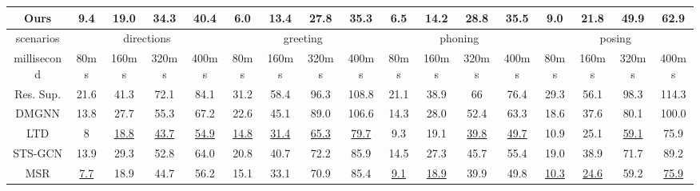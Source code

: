 \begin{table}[h]
{\begin{tabular}{c|cccc|cccc|cccc|cccc}
    Ours   & \textbf{9.4}  & \textbf{19.0} & \textbf{34.3} & \textbf{40.4} & \textbf{6.0}  & \textbf{13.4} & \textbf{27.8} & \textbf{35.3} & \textbf{6.5}  & \textbf{14.2} & \textbf{28.8} & \textbf{35.5} & \textbf{9.0} & \textbf{21.8} & \textbf{49.9} & \textbf{62.9} \\\hline
    scenarios   & \multicolumn{4}{c|}{directions}                                & \multicolumn{4}{c|}{greeting}                                  & \multicolumn{4}{c|}{phoning}                                   & \multicolumn{4}{c}{posing}                                   \\ \hline
    millisecond & 80ms          & 160ms         & 320ms         & 400ms         & 80ms          & 160ms         & 320ms         & 400ms         & 80ms          & 160ms         & 320ms         & 400ms         & 80ms         & 160ms         & 320ms         & 400ms         \\ \hline
    Res. Sup.   & 21.6          & 41.3          & 72.1          & 84.1          & 31.2          & 58.4          & 96.3          & 108.8         & 21.1          & 38.9          & 66            & 76.4          & 29.3         & 56.1          & 98.3          & 114.3         \\
    DMGNN & 13.8          & 27.7          & 55.3          & 67.2          & 22.6          & 45.1          & 89.0          & 106.6         & 14.3          & 28.0          & 52.4          & 63.3          & 18.6         & 37.6          & 80.1          & 100.0         \\
    LTD   & 8             & \underline{18.8}          & \underline{43.7}          & \underline{54.9}          & \underline{14.8}          & \underline{31.4}          & \underline{65.3}          & \underline{79.7}          & 9.3           & 19.1          & \underline{39.8}          & \underline{49.7}          & 10.9         & 25.1          & \underline{59.1}          & 75.9          \\
    STS-GCN              & 13.9                 & 29.3                 & 52.8                 & 64.0                          & 20.8                 & 40.7                 & 72.2                 & 85.9                 & 14.5                 & 27.3                 & 45.7                 & 55.4                 & 19.0                 & 38.9                 & 71.7                 & 89.2                 \\
    MSR   & \underline{7.7}           & 18.9          & 44.7          & 56.2          & 15.1          & 33.1          & 70.9          & 85.4          & \underline{9.1}           & \underline{18.9}          & 39.9          & 49.8          & \underline{10.3}         & \underline{24.6}          & 59.2          & \underline{75.9}          \\

\end{tabular}}
\end{table}

